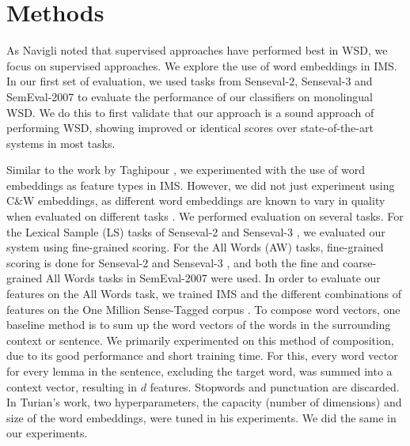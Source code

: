 \section{Methods}
\label{section:methods}

As Navigli  noted that supervised approaches have performed best in WSD, we focus on supervised approaches. 
We explore the use of word embeddings in IMS. 
In our first set of evaluation, we used tasks from Senseval-2, Senseval-3 and SemEval-2007 to evaluate the performance of our classifiers on monolingual WSD. We do this to first validate that our approach is a sound approach of performing WSD, showing improved or identical scores over state-of-the-art systems in most tasks. 

Similar to the work by Taghipour , we experimented with the use of word embeddings as feature types in IMS. However, we did not just experiment using C\&W embeddings, as different word embeddings are known to vary in quality when evaluated on different tasks \cite{schnabel2015evaluation}. We performed evaluation on several tasks. For the Lexical Sample (LS) tasks of Senseval-2 \cite{senseval2-LS-kilgarriff2001} and Senseval-3 \cite{senseval3-LS-mihalcea2004}, we evaluated our system using fine-grained scoring. For the All Words (AW) tasks, fine-grained scoring is done for Senseval-2 \cite{senseval2-AW-palmer2001} and Senseval-3 \cite{senseval3-AW-snyder2004}, and both the fine \cite{semeval2007-fine-pradhan2007} and coarse-grained \cite{semeval2007-coarse-navigli2007} All Words tasks in SemEval-2007 were used. In order to evaluate our features on the All Words task, we trained IMS and the different combinations of features on the One Million Sense-Tagged corpus \cite{taghipour2015one}.
To compose word vectors, one baseline method is to sum up the word vectors of the words in the surrounding context or sentence. We primarily experimented on this method of composition, due to its good performance and short training time. For this, every word vector for every lemma in the sentence, excluding the target word, was summed into a context vector, resulting in $d$ features. Stopwords and punctuation are discarded. In Turian's  work, two hyperparameters, the capacity (number of dimensions) and size of the word embeddings, were tuned in his experiments. We did the same in our experiments.

